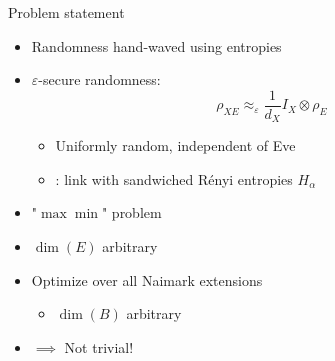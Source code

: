\documentclass[aspectratio=169]{beamer}
\begin{document}
\begin{frame}{Problem statement}
	\begin{itemize}
		\item Randomness hand-waved using entropies\pause
		\item $\varepsilon$-secure randomness:
			\[\rho_{XE}\approx_{\varepsilon}\frac{1}{d_X}I_X\otimes\rho_E\]
		\pause
			\begin{itemize}
				\item Uniformly random\pause, independent of Eve\pause
				\item \citep{Dup23}: link with sandwiched Rényi entropies $H_\alpha$
			\end{itemize}
	\end{itemize}
	\pause
	\begin{center}
	\end{center}
	\begin{minipage}[t]{.5\textwidth}
		\begin{itemize}
			\item<8-> "$\max\min$" problem
			\item<9-> $\dim(E)$ arbitrary
		\end{itemize}
	\end{minipage}%
	\begin{minipage}[t]{.5\textwidth}
		\begin{itemize}
			\item<10-> Optimize over all Naimark extensions
				\begin{itemize}
					\item<11-> $\dim(B)$ arbitrary
				\end{itemize}
			\item<12-> $\implies$ Not trivial!
		\end{itemize}
	\end{minipage}
\end{frame}
\end{document}
